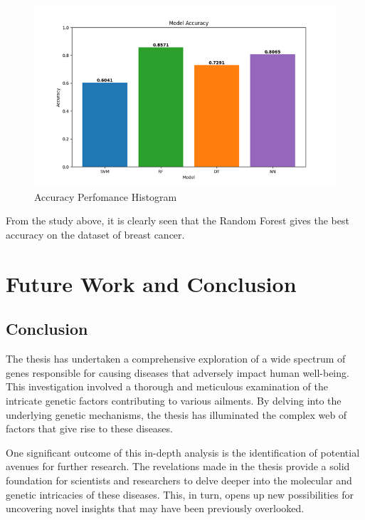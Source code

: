  \begin{figure}[!h]
     \centering
     \includegraphics[width=1\linewidth]{Model Accuracy.png}
     \caption{Accuracy Perfomance Histogram}
     \label{fig: Accuracy Histogram}
 \end{figure}

From the study above, it is clearly seen that the Random Forest gives the best accuracy on the dataset of breast cancer. \cite{33}

\chapter{Future Work and Conclusion}

\section{Conclusion}


The thesis has undertaken a comprehensive exploration of a wide spectrum of genes responsible for causing diseases that adversely impact human well-being. This investigation involved a thorough and meticulous examination of the intricate genetic factors contributing to various ailments. By delving into the underlying genetic mechanisms, the thesis has illuminated the complex web of factors that give rise to these diseases.

One significant outcome of this in-depth analysis is the identification of potential avenues for further research. The revelations made in the thesis provide a solid foundation for scientists and researchers to delve deeper into the molecular and genetic intricacies of these diseases. This, in turn, opens up new possibilities for uncovering novel insights that may have been previously overlooked.

